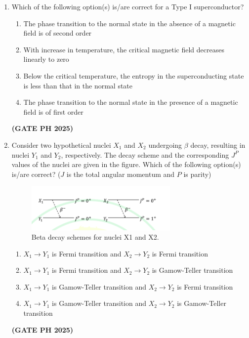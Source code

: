 \documentclass[14pt, a4paper]{extarticle}
\begin{document}
\begin{enumerate}[label=\textbf{Q.\arabic*}]
\item Which of the following option(s) is/are correct for a Type I superconductor?
\begin{enumerate}
\item The phase transition to the normal state in the absence of a magnetic field is of second order
\item With increase in temperature, the critical magnetic field decreases linearly to zero
\item Below the critical temperature, the entropy in the superconducting state is less than that in the normal state
\item The phase transition to the normal state in the presence of a magnetic field is of first order
\end{enumerate}
\hfill \textbf{(GATE PH 2025)}

\item Consider two hypothetical nuclei $X_1$ and $X_2$ undergoing $\beta$ decay, resulting in nuclei $Y_1$ and $Y_2$, respectively. The decay scheme and the corresponding $J^P$ values of the nuclei are given in the figure. Which of the following option(s) is/are correct? ($J$ is the total angular momentum and $P$ is parity)
\begin{figure}[H]
\centering
\includegraphics[width=0.7\textwidth]{figs/q48fig25.png}
\caption{Beta decay schemes for nuclei X1 and X2.}
\label{fig:q48_beta_decay}
\end{figure}
\begin{enumerate}
\item $X_1 \to Y_1$ is Fermi transition and $X_2 \to Y_2$ is Fermi transition
\item $X_1 \to Y_1$ is Fermi transition and $X_2 \to Y_2$ is Gamow-Teller transition
\item $X_1 \to Y_1$ is Gamow-Teller transition and $X_2 \to Y_2$ is Fermi transition
\item $X_1 \to Y_1$ is Gamow-Teller transition and $X_2 \to Y_2$ is Gamow-Teller transition
\end{enumerate}
\hfill \textbf{(GATE PH 2025)}


\end{enumerate}
\end{document}
